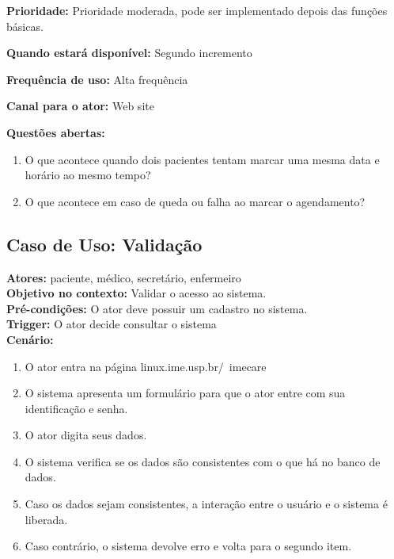 \documentclass[11pt,a4paper]{report}
\begin{document}
\textbf{Prioridade:} Prioridade moderada, pode ser implementado depois das funções básicas.\newline

\textbf{Quando estará disponível:} Segundo incremento\newline

\textbf{Frequência de uso:} Alta frequência\newline

\textbf{Canal para o ator:} Web site\newline

\textbf{Questões abertas:}
\begin{enumerate}
\item O que acontece quando dois pacientes tentam marcar uma mesma data e horário ao mesmo tempo?
\item O que acontece em caso de queda ou falha ao marcar o agendamento?
\end{enumerate}



\subsection{Caso de Uso: Validação}

\textbf{Atores:} paciente, médico, secretário, enfermeiro\\

\textbf{Objetivo no contexto:} Validar o acesso ao sistema.\\

\textbf{Pré-condições:} O ator deve possuir um cadastro no sistema.\\

\textbf{Trigger:} O ator decide consultar o sistema\\

\textbf{Cenário:}
\begin{enumerate}
\item O ator entra na página linux.ime.usp.br/~imecare
\item O sistema apresenta um formulário para que o ator entre com sua identificação e senha.
\item O ator digita seus dados.
\item O sistema verifica se os dados são consistentes com o que há no banco de dados.
\item Caso os dados sejam consistentes, a interação entre o usuário e o sistema é liberada.
\item Caso contrário, o sistema devolve erro e volta para o segundo item.
\end{enumerate}
\end{document}

